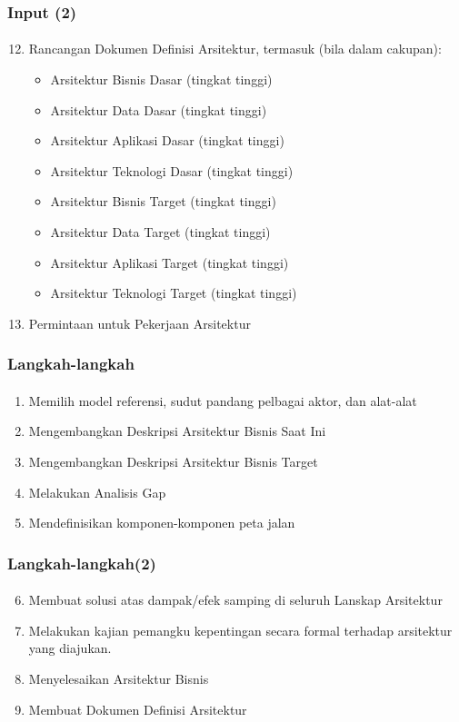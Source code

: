 \documentclass[aspectratio=169, table]{beamer}
\begin{document}
	\begin{frame}
		\frametitle{Input (2)}
		\framesubtitle{\hspace{1cm}}
		\begin{enumerate}
			\setcounter{enumi}{11}
			\item Rancangan Dokumen Definisi Arsitektur, termasuk (bila dalam cakupan):
			\begin{itemize}
				\item Arsitektur Bisnis Dasar (tingkat tinggi)
				\item Arsitektur Data Dasar (tingkat tinggi)
				\item Arsitektur Aplikasi Dasar (tingkat tinggi)
				\item Arsitektur Teknologi Dasar (tingkat tinggi)
				\item Arsitektur Bisnis Target (tingkat tinggi)
				\item Arsitektur Data Target (tingkat tinggi)
				\item Arsitektur Aplikasi Target (tingkat tinggi)
				\item Arsitektur Teknologi Target (tingkat tinggi)
			\end{itemize}
				\item Permintaan untuk Pekerjaan Arsitektur
		\end{enumerate}
	\end{frame}
	
	\begin{frame}
		\frametitle{Langkah-langkah}
		\framesubtitle{\hspace{1cm}}
		\begin{enumerate}
			\item Memilih model referensi, sudut pandang pelbagai aktor, dan alat-alat
			\item Mengembangkan Deskripsi Arsitektur Bisnis Saat Ini
			\item Mengembangkan Deskripsi Arsitektur Bisnis Target
			\item Melakukan Analisis Gap
			\item Mendefinisikan komponen-komponen peta jalan
		\end{enumerate}
		
		
	\end{frame}
	
	\begin{frame}
		\frametitle{Langkah-langkah(2)}
		\framesubtitle{\hspace{1cm}}
		\begin{enumerate}
			\setcounter{enumi}{5}
			\item Membuat solusi atas dampak/efek samping di seluruh Lanskap Arsitektur
			\item Melakukan kajian pemangku kepentingan secara formal terhadap arsitektur yang diajukan.
			\item Menyelesaikan Arsitektur Bisnis
			\item Membuat Dokumen Definisi Arsitektur
		\end{enumerate}
		
		
	\end{frame}
	
\end{document}
